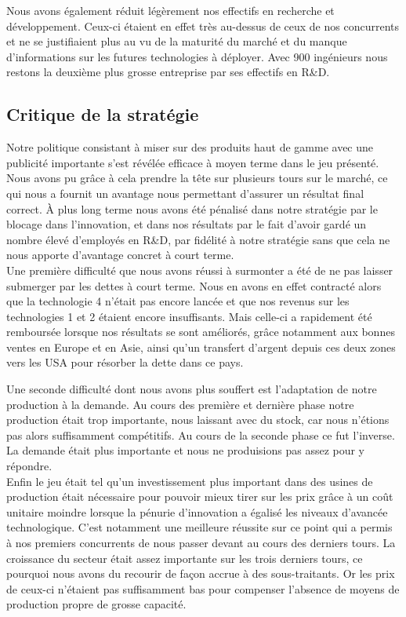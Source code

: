 \documentclass[a4paper,11pt]{article}
\theoremstyle{remark}
\begin{document}
	Nous avons également réduit légèrement nos effectifs en recherche et développement.
	Ceux-ci étaient en effet très au-dessus de ceux de nos concurrents et ne se justifiaient plus au vu de la maturité du marché et du manque d'informations sur les futures technologies à déployer.
	Avec 900 ingénieurs nous restons la deuxième plus grosse entreprise par ses effectifs en R\&D.
	
	\subsection{Critique de la stratégie}

	Notre politique consistant à miser sur des produits haut de gamme avec une publicité importante s'est révélée efficace à moyen terme dans le jeu présenté.
	Nous avons pu grâce à cela prendre la tête sur plusieurs tours sur le marché, ce qui nous a fournit un avantage nous permettant d'assurer un résultat final correct.
	À plus long terme nous avons été pénalisé dans notre stratégie par le blocage dans l'innovation, et dans nos résultats par le fait d'avoir gardé un nombre élevé d'employés en R\&D, par fidélité à notre stratégie sans que cela ne nous apporte d'avantage concret à court terme.\\
	
	Une première difficulté que nous avons réussi à surmonter a été de ne pas laisser submerger par les dettes à court terme.
	Nous en avons en effet contracté alors que la technologie 4 n'était pas encore lancée et que nos revenus sur les technologies 1 et 2 étaient encore insuffisants.
	Mais celle-ci a rapidement été remboursée lorsque nos résultats se sont améliorés, grâce notamment aux bonnes ventes en Europe et en Asie, ainsi qu'un transfert d'argent depuis ces deux zones vers les USA pour résorber la dette dans ce pays.
	
	Une seconde difficulté dont nous avons plus souffert est l'adaptation de notre production à la demande.
	Au cours des première et dernière phase notre production était trop importante, nous laissant avec du stock, car nous n'étions pas alors suffisamment compétitifs.
	Au cours de la seconde phase ce fut l'inverse.
	La demande était plus importante et nous ne produisions pas assez pour y répondre.\\
	
	Enfin le jeu était tel qu'un investissement plus important dans des usines de production était nécessaire pour pouvoir mieux tirer sur les prix grâce à un coût unitaire moindre lorsque la pénurie d'innovation a égalisé les niveaux d'avancée technologique.
	C'est notamment une meilleure réussite sur ce point qui a permis à nos premiers concurrents de nous passer devant au cours des derniers tours.
	La croissance du secteur était assez importante sur les trois derniers tours, ce pourquoi nous avons du recourir de façon accrue à des sous-traitants.
	Or les prix de ceux-ci n'étaient pas suffisamment bas pour compenser l'absence de moyens de production propre de grosse capacité.\\
	
\end{document}
